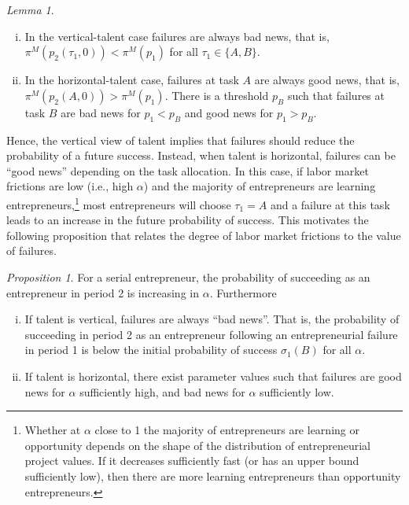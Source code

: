 \documentclass[12pt,american]{paper}
\theoremstyle{remark}
\newtheorem{prop}{Proposition}
\newtheorem{lemma}{Lemma}
\begin{document}
%
\begin{lemma}\label{lem: learning value of failures}
\begin{enumerate}[(i)]\setlength\itemsep{0em}
\item In the vertical-talent case failures are always bad news, that is,  $\pi^M(p_2(\tau_1,0))<\pi^M(p_1)$ for all $\tau_1\in \{A,B\}$.
\item In the horizontal-talent case, failures at task $A$ are always good news, that is, $\pi^M(p_2(A,0))>\pi^M(p_1)$. There is a threshold $p_B$ such that failures at task $B$ are bad news for $p_1<p_B$ and good news for $p_1>p_B$.
\end{enumerate}
\end{lemma}
%
Hence, the vertical view of talent implies that failures should reduce the probability of a future success. Instead, when talent is horizontal, failures can be ``good news'' depending on the task allocation. In this case, if labor market frictions are low (i.e., high $\alpha$) and the majority of entrepreneurs are learning entrepreneurs,\footnote{Whether at $\alpha$ close to 1 the majority of entrepreneurs are learning or opportunity depends on the shape of the distribution of entrepreneurial project values. If it decreases sufficiently fast (or has an upper bound sufficiently low), then there are more learning entrepreneurs than opportunity entrepreneurs.} most entrepreneurs will choose $\tau_1=A$ and a failure at this task leads to an increase in the future probability of success. This motivates the following proposition that relates the degree of labor market frictions to the value of failures.
%
\begin{prop}
	\label{prop:probability-of-success} For a serial entrepreneur, the probability of succeeding as an entrepreneur in period 2 is increasing in $\alpha$. Furthermore
 \begin{enumerate}[(i)]\setlength\itemsep{0em}
\item If talent is vertical, failures are always ``bad news''. That is, the probability of succeeding in period 2 as an entrepreneur following an entrepreneurial failure in period 1 is below the initial probability of success $\sigma_1 (B)$ for all $\alpha$. 
\item If talent is horizontal, there exist parameter values such that failures are good news for $\alpha$ sufficiently high, and bad news for $\alpha$ sufficiently low.
\end{enumerate}
\end{prop}
%
\end{document}
